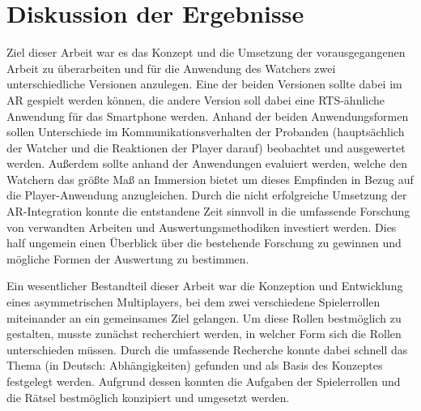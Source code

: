 \chapter{Diskussion der Ergebnisse} 
Ziel dieser Arbeit war es das Konzept und die Umsetzung der vorausgegangenen Arbeit zu überarbeiten und für die Anwendung des Watchers zwei unterschiedliche Versionen anzulegen. Eine der beiden Versionen sollte dabei im \ac{AR} gespielt werden können, die andere Version soll dabei eine \ac{RTS}-ähnliche Anwendung für das Smartphone werden. Anhand der beiden Anwendungsformen sollen Unterschiede im Kommunikationsverhalten der Probanden (hauptsächlich der Watcher und die Reaktionen der Player darauf) beobachtet und ausgewertet werden. Außerdem sollte anhand der Anwendungen evaluiert werden, welche den Watchern das größte Maß an Immersion bietet um dieses Empfinden in Bezug auf die Player-Anwendung anzugleichen. 
Durch die nicht erfolgreiche Umsetzung der \ac{AR}-Integration konnte die entstandene Zeit sinnvoll in die umfassende Forschung von verwandten Arbeiten und Auswertungsmethodiken investiert werden. Dies half ungemein einen Überblick über die bestehende Forschung zu gewinnen und mögliche Formen der Auswertung zu bestimmen.

Ein wesentlicher Bestandteil dieser Arbeit war die Konzeption und Entwicklung eines asymmetrischen Multiplayers, bei dem zwei verschiedene Spielerrollen miteinander an ein gemeinsames Ziel gelangen. Um diese Rollen bestmöglich zu gestalten, musste zunächst recherchiert werden, in welcher Form sich die Rollen unterschieden müssen. Durch die umfassende Recherche konnte dabei schnell das Thema  (in Deutsch: Abhängigkeiten) gefunden und als Basis des Konzeptes festgelegt werden. Aufgrund dessen konnten die Aufgaben der Spielerrollen und die Rätsel bestmöglich konzipiert und umgesetzt werden.


